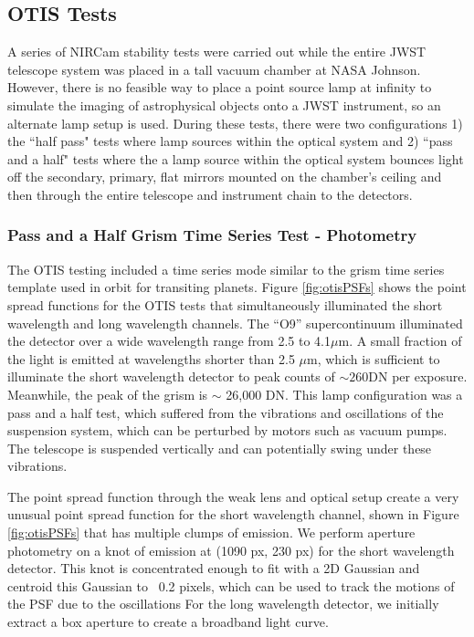\documentclass{aastex62}
\begin{document}
\subsection{OTIS Tests}

A series of NIRCam stability tests were carried out while the entire JWST telescope system was placed in a tall vacuum chamber at NASA Johnson.
However, there is no feasible way to place a point source lamp at infinity to simulate the imaging of astrophysical objects onto a JWST instrument, so an alternate lamp setup is used.
During these tests, there were two configurations 1) the ``half pass" tests where lamp sources within the optical system and 2) ``pass and a half" tests where the a lamp source within the optical system bounces light off the secondary, primary, flat mirrors mounted on the chamber's ceiling and then through the entire telescope and instrument chain to the detectors.

\subsubsection{Pass and a Half Grism Time Series Test - Photometry}
The OTIS testing included a time series mode similar to the grism time series template used in orbit for transiting planets.
Figure \ref{fig:otisPSFs} shows the point spread functions for the OTIS tests that simultaneously illuminated the short wavelength and long wavelength channels.
The ``O9'' supercontinuum illuminated the detector over a wide wavelength range from 2.5 to 4.1$\mu$m.
A small fraction of the light is emitted at wavelengths shorter than 2.5 $\mu$m, which is sufficient to illuminate the short wavelength detector to peak counts of $\sim 260$DN per exposure.
Meanwhile, the peak of the grism is $\sim$ 26,000 DN.
This lamp configuration was a pass and a half test, which suffered from the vibrations and oscillations of the suspension system, which can be perturbed by motors such as vacuum pumps.
The telescope is suspended vertically and can potentially swing under these vibrations.

The point spread function through the weak lens and optical setup create a very unusual point spread function for the short wavelength channel, shown in Figure \ref{fig:otisPSFs} that has multiple clumps of emission.
We perform aperture photometry on a knot of emission at (1090 px, 230 px) for the short wavelength detector.
This knot is concentrated enough to fit with a 2D Gaussian and centroid this Gaussian to ~0.2 pixels, which can be used to track the motions of the PSF due to the oscillations
For the long wavelength detector, we initially extract a box aperture to create a broadband light curve.
\end{document}

